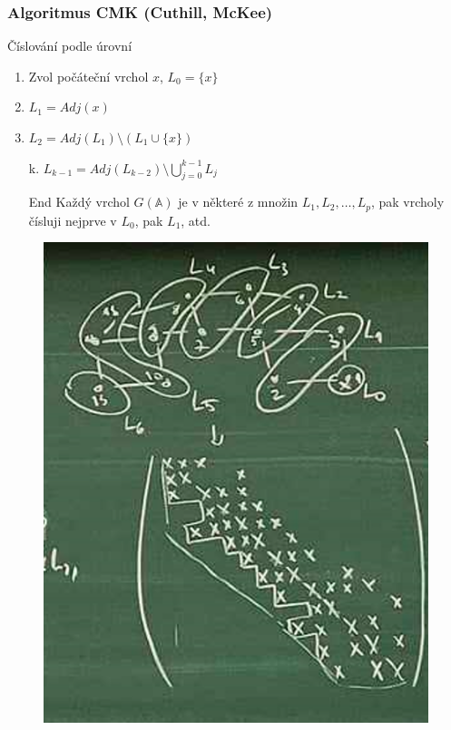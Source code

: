 \documentclass[../main.tex]{subfiles}
\begin{document}
\subsubsection{Algoritmus CMK (Cuthill, McKee)}
Číslování podle úrovní

\begin{enumerate}
    \item Zvol počáteční vrchol $x$, $L_0 = \{x\}$
    \item $L_1 = Adj(x)$
    \item $L_2 = Adj(L_1)\setminus(L_1 \cup \{x\})$
    \item[k.] $L_{k-1} = Adj(L_{k-2}) \setminus \bigcup_{j=0}^{k-1} L_j$  
    \item[End] Každý vrchol $G(\mathbb{A})$ je v některé z množin $L_1,L_2,\dots,L_p$, pak vrcholy čísluji nejprve v $L_0$, pak $L_1$, atd.   
\end{enumerate}

\begin{example}
    \begin{figure}[H]
        \centering
        \includegraphics{images/26-10-CMK.png}
    \end{figure}
\end{example}
\end{document}
